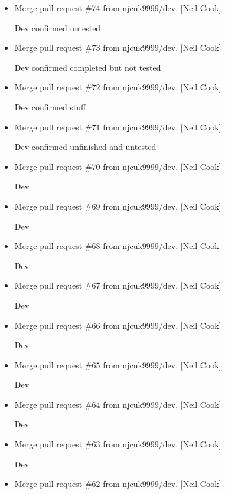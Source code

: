 \documentclass[a4paper,10pt,english]{report}
\begin{document}
\begin{itemize}
\item {} 
Merge pull request \#74 from njcuk9999/dev. {[}Neil Cook{]}

Dev \sphinxhyphen{} confirmed untested

\item {} 
Merge pull request \#73 from njcuk9999/dev. {[}Neil Cook{]}

Dev \sphinxhyphen{} confirmed  completed but not tested

\item {} 
Merge pull request \#72 from njcuk9999/dev. {[}Neil Cook{]}

Dev \sphinxhyphen{} confirmed  stuff

\item {} 
Merge pull request \#71 from njcuk9999/dev. {[}Neil Cook{]}

Dev \sphinxhyphen{} confirmed unfinished and untested

\item {} 
Merge pull request \#70 from njcuk9999/dev. {[}Neil Cook{]}

Dev

\item {} 
Merge pull request \#69 from njcuk9999/dev. {[}Neil Cook{]}

Dev

\item {} 
Merge pull request \#68 from njcuk9999/dev. {[}Neil Cook{]}

Dev

\item {} 
Merge pull request \#67 from njcuk9999/dev. {[}Neil Cook{]}

Dev

\item {} 
Merge pull request \#66 from njcuk9999/dev. {[}Neil Cook{]}

Dev

\item {} 
Merge pull request \#65 from njcuk9999/dev. {[}Neil Cook{]}

Dev

\item {} 
Merge pull request \#64 from njcuk9999/dev. {[}Neil Cook{]}

Dev

\item {} 
Merge pull request \#63 from njcuk9999/dev. {[}Neil Cook{]}

Dev

\item {} 
Merge pull request \#62 from njcuk9999/dev. {[}Neil Cook{]}


\end{itemize}
\end{document}
